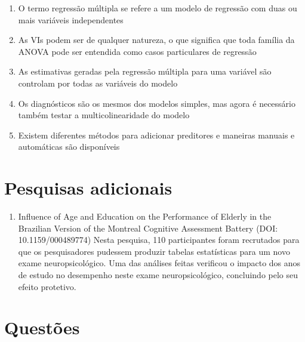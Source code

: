 \documentclass[
]{book}
\providecommand{\tightlist}{%
  \setlength{\itemsep}{0pt}\setlength{\parskip}{0pt}}
\begin{document}
\begin{explore}

\begin{enumerate}
\def\labelenumi{\arabic{enumi}.}
\tightlist
\item
  O termo regressão múltipla se refere a um modelo de regressão com duas
  ou mais variáveis independentes\\
\item
  As VIs podem ser de qualquer natureza, o que significa que toda
  família da ANOVA pode ser entendida como casos particulares de
  regressão
\item
  As estimativas geradas pela regressão múltipla para uma variável são
  controlam por todas as variáveis do modelo\\
\item
  Os diagnósticos são os mesmos dos modelos simples, mas agora é
  necessário também testar a multicolinearidade do modelo\\
\item
  Existem diferentes métodos para adicionar preditores e maneiras
  manuais e automáticas são disponíveis\\
\end{enumerate}

\end{explore}

\hypertarget{pesquisas-adicionais-7}{%
\section{Pesquisas adicionais}\label{pesquisas-adicionais-7}}

\begin{enumerate}
\def\labelenumi{\arabic{enumi}.}
\tightlist
\item
  Influence of Age and Education on the Performance of Elderly in the
  Brazilian Version of the Montreal Cognitive Assessment Battery (DOI:
  10.1159/000489774) Nesta pesquisa, 110 participantes foram recrutados
  para que os pesquisadores pudessem produzir tabelas estatísticas para
  um novo exame neuropsicológico. Uma das análises feitas verificou o
  impacto dos anos de estudo no desempenho neste exame neuropsicológico,
  concluindo pelo seu efeito protetivo.
\end{enumerate}

\hypertarget{questuxf5es-5}{%
\section{Questões}\label{questuxf5es-5}}
\end{document}
